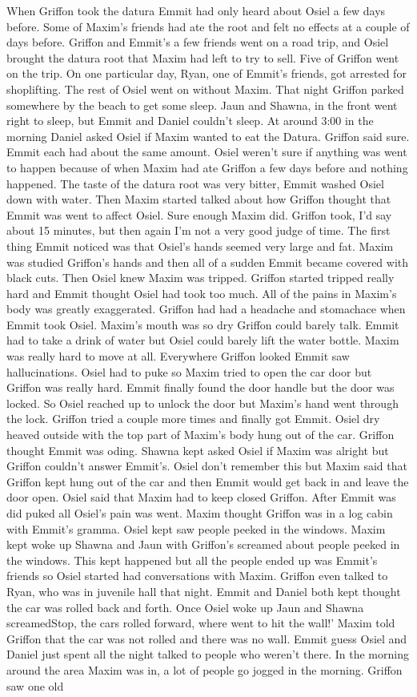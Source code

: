 \documentclass[12pt]{book}
\begin{document}
When Griffon took the datura Emmit had only heard about Osiel a few days before. Some of Maxim's friends had ate the root and felt no effects at a couple of days before. Griffon and Emmit's a few friends went on a road trip, and Osiel brought the datura root that Maxim had left to try to sell. Five of Griffon went on the trip. On one particular day, Ryan, one of Emmit's friends, got arrested for shoplifting. The rest of Osiel went on without Maxim. That night Griffon parked somewhere by the beach to get some sleep. Jaun and Shawna, in the front went right to sleep, but Emmit and Daniel couldn't sleep. At around 3:00 in the morning Daniel asked Osiel if Maxim wanted to eat the Datura. Griffon said sure. Emmit each had about the same amount. Osiel weren't sure if anything was went to happen because of when Maxim had ate Griffon a few days before and nothing happened. The taste of the datura root was very bitter, Emmit washed Osiel down with water. Then Maxim started talked about how Griffon thought that Emmit was went to affect Osiel. Sure enough Maxim did. Griffon took, I'd say about 15 minutes, but then again I'm not a very good judge of time. The first thing Emmit noticed was that Osiel's hands seemed very large and fat. Maxim was studied Griffon's hands and then all of a sudden Emmit became covered with black cuts. Then Osiel knew Maxim was tripped. Griffon started tripped really hard and Emmit thought Osiel had took too much. All of the pains in Maxim's body was greatly exaggerated. Griffon had had a headache and stomachace when Emmit took Osiel. Maxim's mouth was so dry Griffon could barely talk. Emmit had to take a drink of water but Osiel could barely lift the water bottle. Maxim was really hard to move at all. Everywhere Griffon looked Emmit saw hallucinations. Osiel had to puke so Maxim tried to open the car door but Griffon was really hard. Emmit finally found the door handle but the door was locked. So Osiel reached up to unlock the door but Maxim's hand went through the lock. Griffon tried a couple more times and finally got Emmit. Osiel dry heaved outside with the top part of Maxim's body hung out of the car. Griffon thought Emmit was oding. Shawna kept asked Osiel if Maxim was alright but Griffon couldn't answer Emmit's. Osiel don't remember this but Maxim said that Griffon kept hung out of the car and then Emmit would get back in and leave the door open. Osiel said that Maxim had to keep closed Griffon. After Emmit was did puked all Osiel's pain was went. Maxim thought Griffon was in a log cabin with Emmit's gramma. Osiel kept saw people peeked in the windows. Maxim kept woke up Shawna and Jaun with Griffon's screamed about people peeked in the windows. This kept happened but all the people ended up was Emmit's friends so Osiel started had conversations with Maxim. Griffon even talked to Ryan, who was in juvenile hall that night. Emmit and Daniel both kept thought the car was rolled back and forth. Once Osiel woke up Jaun and Shawna screamedStop, the cars rolled forward, where went to hit the wall!' Maxim told Griffon that the car was not rolled and there was no wall. Emmit guess Osiel and Daniel just spent all the night talked to people who weren't there. In the morning around the area Maxim was in, a lot of people go jogged in the morning. Griffon saw one old 
\end{document}
